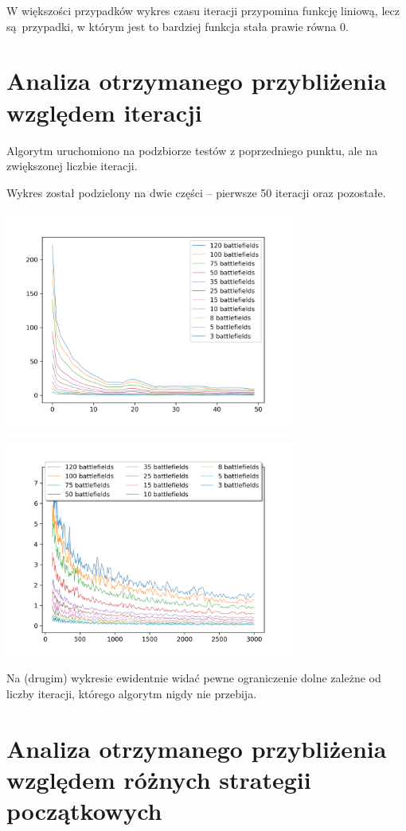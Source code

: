 \documentclass{article}
\begin{document}
W większości przypadków wykres czasu iteracji przypomina funkcję liniową, lecz
są przypadki, w którym jest to bardziej funkcja stała prawie równa 0.

\section{Analiza otrzymanego przybliżenia względem iteracji}

Algorytm uruchomiono na podzbiorze testów z poprzedniego punktu, ale na
zwiększonej liczbie iteracji.

Wykres został podzielony na dwie części -- pierwsze 50 iteracji oraz pozostałe.
\begin{center}
\includegraphics[width=360px]{./results/early_epsilon_after_step.png}

\includegraphics[width=360px]{./results/late_epsilon_after_step.png}
\end{center}

Na (drugim) wykresie ewidentnie widać pewne ograniczenie dolne zależne od
liczby iteracji, którego algorytm nigdy nie przebija.

\section{Analiza otrzymanego przybliżenia względem różnych strategii początkowych}
\end{document}
